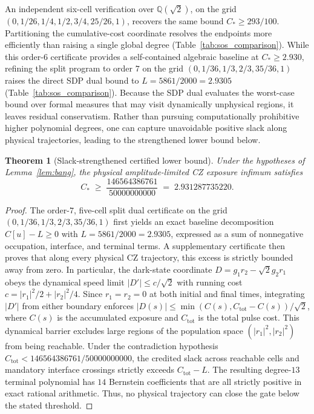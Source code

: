 \documentclass[aps,prx,reprint,nofootinbib,longbibliography,floatfix]{revtex4-2}
\newtheorem{theorem}{Theorem}
\theoremstyle{plain}
\theoremstyle{remark}
\begin{document}
An independent six-cell verification over $\mathbb{Q}(\sqrt{2})$, on the grid
$(0,1/26,1/4,1/2,3/4,25/26,1)$, recovers the same bound $C_*\ge293/100$.
Partitioning the cumulative-cost coordinate resolves the endpoints more
efficiently than raising a single global degree (Table~\ref{tab:sos_comparison}).
While this order-$6$ certificate provides a self-contained algebraic baseline at $C_* \ge 2.930$, refining the split program to order $7$ on the grid $(0, 1/36, 1/3, 2/3, 35/36, 1)$ raises the direct SDP dual bound to $L = 5861/2000 = 2.9305$ (Table~\ref{tab:sos_comparison}). Because the SDP dual evaluates the worst-case bound over formal measures that may visit dynamically unphysical regions, it leaves residual conservatism. Rather than pursuing computationally prohibitive higher polynomial degrees, one can capture unavoidable positive slack along physical trajectories, leading to the strengthened lower bound below.

\begin{theorem}[Slack-strengthened certified lower bound]
\label{thm:slack_strengthened}
Under the hypotheses of Lemma~\ref{lem:bang}, the physical amplitude-limited CZ exposure infimum satisfies
\begin{equation}
C_* \;\ge\; \frac{146564386761}{50000000000} \;=\; 2.931287735220.
\label{eq:slack_strengthened_bound}
\end{equation}
\end{theorem}
\begin{proof}
The order-$7$, five-cell split dual certificate on the grid $(0, 1/36, 1/3, 2/3, 35/36, 1)$ first yields an exact baseline decomposition $C[u] - L \ge 0$ with $L = 5861/2000 = 2.9305$, expressed as a sum of nonnegative occupation, interface, and terminal terms. A supplementary certificate then proves that along every physical CZ trajectory, this excess is strictly bounded away from zero. In particular, the dark-state coordinate $D = g_1r_2 - \sqrt{2}g_2r_1$ obeys the dynamical speed limit $|D'| \le c/\sqrt{2}$ with running cost $c = |r_1|^2/2 + |r_2|^2/4$. Since $r_1=r_2=0$ at both initial and final times, integrating $|D'|$ from either boundary enforces $|D(s)| \le \min(C(s), C_{\mathrm{tot}}-C(s))/\sqrt{2}$, where $C(s)$ is the accumulated exposure and $C_{\mathrm{tot}}$ is the total pulse cost. This dynamical barrier excludes large regions of the population space $(|r_1|^2, |r_2|^2)$ from being reachable. Under the contradiction hypothesis $C_{\mathrm{tot}} < 146564386761/50000000000$, the credited slack across reachable cells and mandatory interface crossings strictly exceeds $C_{\mathrm{tot}} - L$. The resulting degree-$13$ terminal polynomial has $14$ Bernstein coefficients that are all strictly positive in exact rational arithmetic. Thus, no physical trajectory can close the gate below the stated threshold.
\end{proof}
\end{document}
